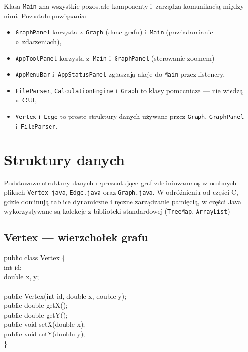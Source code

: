 \documentclass[a4paper, 11pt]{article}
\begin{document}
Klasa \texttt{Main} zna wszystkie pozostałe komponenty i~zarządza
komunikacją między nimi. Pozostałe powiązania:

\begin{itemize}
  \item \texttt{GraphPanel} korzysta z~\texttt{Graph} (dane grafu)
    i~\texttt{Main} (powiadamianie o~zdarzeniach),
  \item \texttt{AppToolPanel} korzysta z~\texttt{Main}
    i~\texttt{GraphPanel} (sterowanie zoomem),
  \item \texttt{AppMenuBar} i~\texttt{AppStatusPanel} zgłaszają
    akcje do \texttt{Main} przez listenery,
  \item \texttt{FileParser}, \texttt{CalculationEngine} i~\texttt{Graph}
    to klasy pomocnicze --- nie wiedzą o~GUI,
  \item \texttt{Vertex} i~\texttt{Edge} to proste struktury danych
    używane przez \texttt{Graph}, \texttt{GraphPanel}
    i~\texttt{FileParser}.
\end{itemize}

\section{Struktury danych}

Podstawowe struktury danych reprezentujące graf zdefiniowane są
w osobnych plikach \texttt{Vertex.java}, \texttt{Edge.java}
oraz \texttt{Graph.java}. W odróżnieniu od części C, gdzie dominują
tablice dynamiczne i ręczne zarządzanie pamięcią, w części Java
wykorzystywane są kolekcje z biblioteki standardowej
(\texttt{TreeMap}, \texttt{ArrayList}).

\subsection{Vertex --- wierzchołek grafu}

\begin{filebox}
public class Vertex \{\\
\quad int id;\\
\quad double x, y;\\
\\
\quad public Vertex(int id, double x, double y);\\
\quad public double getX();\\
\quad public double getY();\\
\quad public void setX(double x);\\
\quad public void setY(double y);\\
\}
\end{filebox}
\end{document}
